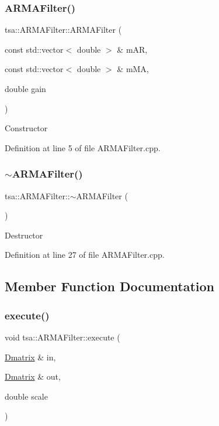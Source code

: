 \subsubsection{\texorpdfstring{A\+R\+M\+A\+Filter()}{ARMAFilter()}}
{\footnotesize\ttfamily tsa\+::\+A\+R\+M\+A\+Filter\+::\+A\+R\+M\+A\+Filter (\begin{DoxyParamCaption}\item[{const std\+::vector$<$ double $>$ \&}]{m\+AR,  }\item[{const std\+::vector$<$ double $>$ \&}]{m\+MA,  }\item[{double}]{gain }\end{DoxyParamCaption})}

Constructor 

Definition at line 5 of file A\+R\+M\+A\+Filter.\+cpp.

\mbox{\label{classtsa_1_1_a_r_m_a_filter_affe37273b08f1c5f21a9d11170f1a119}} 
\subsubsection{\texorpdfstring{$\sim$\+A\+R\+M\+A\+Filter()}{~ARMAFilter()}}
{\footnotesize\ttfamily tsa\+::\+A\+R\+M\+A\+Filter\+::$\sim$\+A\+R\+M\+A\+Filter (\begin{DoxyParamCaption}{ }\end{DoxyParamCaption})\hspace{0.3cm}{\ttfamily [virtual]}}

Destructor 

Definition at line 27 of file A\+R\+M\+A\+Filter.\+cpp.



\subsection{Member Function Documentation}
\mbox{\label{classtsa_1_1_a_r_m_a_filter_a9c0be1ce8ede64c97bc2845423d7380f}} 
\subsubsection{\texorpdfstring{execute()}{execute()}}
{\footnotesize\ttfamily void tsa\+::\+A\+R\+M\+A\+Filter\+::execute (\begin{DoxyParamCaption}\item[{\hyperlink{namespacetsa_ad260cd21c1891c4ed391fe788569aba4}{Dmatrix} \&}]{in,  }\item[{\hyperlink{namespacetsa_ad260cd21c1891c4ed391fe788569aba4}{Dmatrix} \&}]{out,  }\item[{double}]{scale }\end{DoxyParamCaption})}


